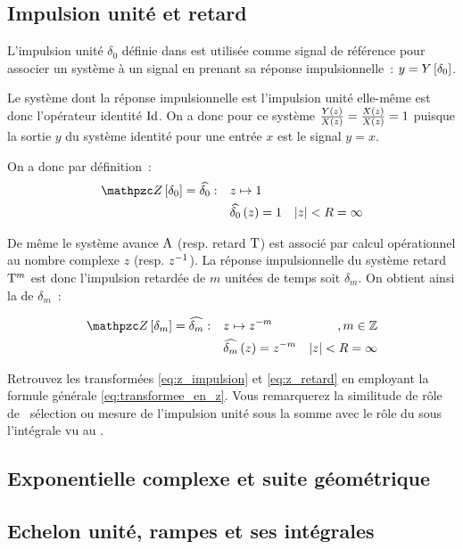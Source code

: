 \subsection{Impulsion unité et retard}

L'impulsion unité $\delta_0$ définie dans 
est utilisée comme signal de référence pour associer un système à un
signal en prenant sa réponse impulsionnelle~: $y=Y\left[\delta_0\right]$.

Le système dont la réponse impulsionnelle est l'impulsion unité
elle-même est donc l'opérateur identité $\mathrm{Id}$. On a donc pour ce
système $\frac{Y\left(z\right)}{X\left(z\right)}=\frac{X\left(z\right)}{X\left(z\right)}=1$ puisque la
sortie $y$ du système identité pour une entrée $x$ est le signal
$y=x$.

On a donc par définition~:
\begin{align}
  \label{eq:z_impulsion}
  \TZ\b{\delta_0}=\TZde{\delta_0} : \quad &z \mapsto 1 \nonumber\\
  &\TZde{\delta_0}\p{z} = 1 & \abs{z}<R = \infty
\end{align}

De même le système avance $\mathrm{A}$ (resp. retard $\mathrm{T}$) est
associé par calcul opérationnel au nombre complexe $z$
(resp. $z^{-1}$). La réponse impulsionnelle du système retard $\mathrm{T}^m$
est donc l'impulsion retardée de $m$ unitées de temps soit
$\delta_m$. On obtient ainsi la \teZ{} de $\delta_m$~:

\begin{align}
  \label{eq:z_retard}
  \TZ\b{\delta_m}=\TZde{\delta_m}: \quad &z \mapsto z^{-m} &, m\in\Z \nonumber\\
  &\TZde{\delta_m}\p{z} = z^{-m}  &  \abs{z}<R = \infty
\end{align}

\begin{exercice}
  Retrouvez les transformées \eqref{eq:z_impulsion} et \eqref{eq:z_retard} en employant la formule générale \eqref{eq:transformee_en_z}. Vous remarquerez la similitude de rôle de \og{} sélection ou mesure \fg{} de l'impulsion unité sous la somme avec le rôle du \Dirac{} sous l'intégrale vu au .
\end{exercice}
\subsection{Exponentielle complexe et suite géométrique}
\subsection{Echelon unité, rampes et ses intégrales}


